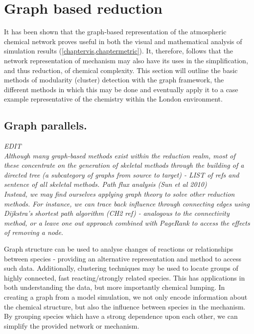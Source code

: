 \section{Graph based reduction}\label{sec:graphreduction}
It has been shown that the graph-based representation of the atmospheric chemical network proves useful in both the visual and mathematical analysis of simulation results (\autoref{chaptervis,chaptermetric}). It, therefore, follows that the network representation of mechanism may also have its uses in the simplification, and thus reduction, of chemical complexity.  This section will outline the basic methods of modularity (cluster) detection with the graph framework, the different methods in which this may be done and eventually apply it to a case example representative of the chemistry within the London environment.




\subsection{Graph parallels. }

\textit{
EDIT\\
Although many graph-based methods exist within the reduction realm, most of these concentrate on the generation of skeletal methods through the building of a directed tree (a subcategory of graphs from source to target) - LIST of refs and sentence of all skeletal methods. Path flux analysis (Sun et al 2010)\\
Instead, we may find ourselves applying graph theory to solve other reduction methods. For instance, we can trace back influence through connecting edges using Dijkstra's shortest path algorithm (CH2 ref) - analogous to the connectivity method, or a leave one out approach combined with PageRank to access the effects of removing a node.
}

Graph structure can be used to analyse changes of reactions or relationships between species - providing an alternative representation and method to access such data. Additionally, clustering techniques may be used to locate groups of highly connected, fast reacting/strongly related species. This has applications in both understanding the data, but more importantly chemical lumping. In creating a graph from a model simulation, we not only encode information about the chemical structure, but also the influence between species in the mechanism. By grouping species which have a strong dependence upon each other, we can simplify the provided network or mechanism. 

